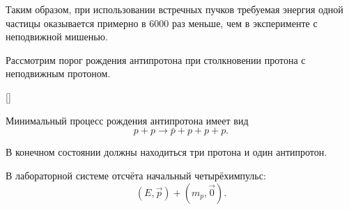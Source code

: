 \documentclass[../final.tex]{subfiles}
\begin{document}
Таким образом, при использовании встречных пучков требуемая энергия
одной частицы оказывается примерно в $6000$ раз меньше, чем
в эксперименте с неподвижной мишенью.



\newpage
{}

\condition

Рассмотрим порог рождения антипротона при столкновении протона
с неподвижным протоном.

\begin{rbox}[left=18pt,right=18pt,top=14pt,bottom=10pt]{[]}
    \centering


    \captionsetup{
        font=footnotesize,
        labelfont=bf,
        skip=5pt
    }

    \label{fig:practice02_antiproton}
\end{rbox}

Минимальный процесс рождения антипротона имеет вид
%
\begin{equation*}
    p+p
    \rightarrow
    \bar p+p+p+p.
\end{equation*}

В конечном состоянии должны находиться три протона и один антипротон.

В лабораторной системе отсчёта начальный четырёхимпульс:
%
\begin{equation*}
    (E,\vec p)
    +
    (m_p,\vec 0).
\end{equation*}
\end{document}
